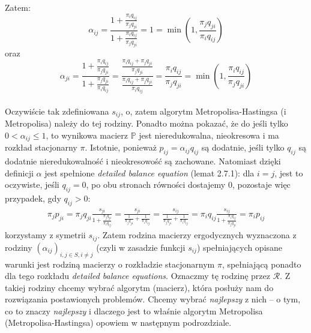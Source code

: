 \documentclass[a4paper]{article}
\begin{document}
Zatem:
$$\alpha_{ij} = \frac{1 + \frac{\pi_i q_{ij}}{\pi_j q_{ji}}}{1 + \frac{\pi_i q_{ij}}{\pi_j q_{ji}}} = 1 = \min(1, \frac{\pi_j q_{ji}}{\pi_i q_{ij}})$$
oraz 
$$\alpha_{ji} = \frac{1 + \frac{\pi_i q_{ij}}{\pi_j q_{ji}}}{1 + \frac{\pi_j q_{ji}}{\pi_i q_{ij}}} = \frac{\frac{\pi_i q_{ij} + \pi_j q_{ji}}{\pi_j q_{ji}}}{\frac{\pi_i q_{ij} + \pi_j q_{ji}}{\pi_i q_{ij}}} = \frac{\pi_i q_{ij}}{\pi_j q_{ji}} = \min(1, \frac{\pi_i q_{ij}}{\pi_j q_{ji}}) $$
\\
Oczywiście tak zdefiniowana $s_{ij}$, o, zatem algorytm Metropolisa-Hastingsa (i Metropolisa) należy do tej rodziny. Ponadto można pokazać, że do jeśli tylko $0 < \alpha_{ij} \leq 1$, to wynikowa macierz $\mathbb{P}$ jest nieredukowalna, nieokresowa i ma rozkład stacjonarny $\pi$. Istotnie, ponieważ $p_{ij} = \alpha_{ij}q_{ij}$ są dodatnie, jeśli tylko $q_{ij}$ są dodatnie nieredukowalność i nieokresowość są zachowane. Natomiast dzięki definicji $\alpha$ jest spełnione \textit{detailed balance equation} (lemat 2.7.1): dla $i = j$, jest to oczywiste, jeśli $q_{ij} = 0$, po obu stronach równości dostajemy $0$, pozostaje więc przypadek, gdy $q_{ij} > 0$:
\begin{align*}
\pi_j p_{ji} = \pi_j q_{ji} \frac{s_{ji}}{1 + \frac{\pi_j q_{ji}}{\pi_i q_{ij}}} = \frac{s_{ji}}{\frac{1}{\pi_j q_{ji}} + \frac{1}{\pi_i q_{ij}}} = \frac{s_{ij}}{\frac{1}{\pi_j q_{ji}} + \frac{1}{\pi_i q_{ij}}} = \pi_i q_{ij} \frac{s_{ij}}{1 + \frac{\pi_i q_{ij}}{\pi_j q_{ji}}} = \pi_i p_{ij}
\end{align*}
korzystamy z symetrii $s_{ij}$. Zatem rodzina macierzy ergodycznych wyznaczona z rodziny $(\alpha_{ij})_{i,j \in S, i \neq j}$ (czyli w zasadzie funkcji $s_{ij}$) spełniających opisane warunki jest rodziną macierzy o rozkładzie stacjonarnym $\pi$, spełniającą ponadto dla tego rozkładu \textit{detailed balance equations}. Oznaczmy tę rodzinę przez $\mathcal{R}$.
Z takiej rodziny chcemy wybrać algorytm (macierz), która posłuży nam do rozwiązania postawionych problemów. Chcemy wybrać \textit{najlepszy} z nich – o tym, co to znaczy \textit{najlepszy} i dlaczego jest to właśnie algorytm Metropolisa (Metropolisa-Hastingsa) opowiem w następnym podrozdziale.
\end{document}
